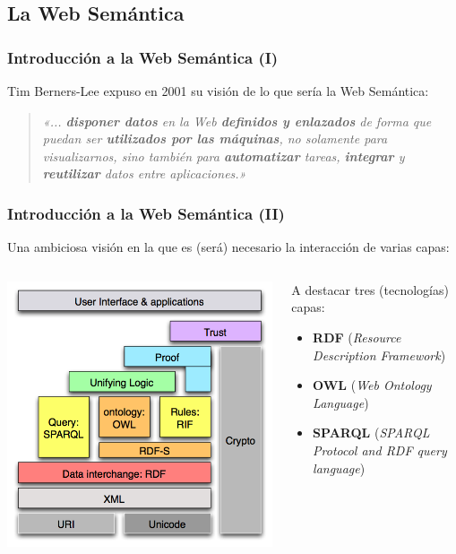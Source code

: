 \documentclass[spanish,notes=hide]{beamer}
\begin{document}
\subsection{La Web Semántica}
\frame
{
  \frametitle{Introducción a la Web Semántica (I)}

  Tim Berners-Lee expuso en 2001 su visión de lo que sería la Web Semántica:

  \begin{quote}
	\emph{«... \textbf{disponer datos} en la Web \textbf{definidos y enlazados} 
	de forma que puedan ser \textbf{utilizados por las máquinas}, no solamente 
	para visualizarnos, sino también para \textbf{automatizar} tareas, 
	\textbf{integrar} y \textbf{reutilizar} datos entre aplicaciones.»}
  \end{quote}
}
\frame
{
  \frametitle{Introducción a la Web Semántica (II)}

  Una ambiciosa visión en la que es (será) necesario la interacción de varias capas:
  \begin{columns}
    \begin{column}{0.5\textwidth}
	\includegraphics[width=\textwidth]{images/semantic-web-stack.png}
    \end{column}
    \begin{column}{0.5\textwidth}
      A destacar tres (tecnologías) capas:
      \begin{itemize}
	\item \textbf{RDF} (\textit{Resource Description Framework})
	\item \textbf{OWL} (\textit{Web Ontology Language})
	\item \textbf{SPARQL} (\textit{SPARQL Protocol and RDF query language})
      \end{itemize}
    \end{column}
  \end{columns}
}
\end{document}
